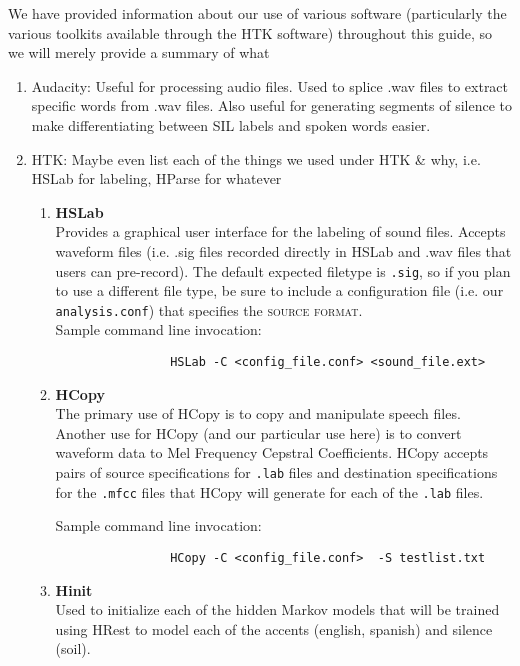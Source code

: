 \documentclass{wileySev}
\begin{document}
We have provided information about our use of various software (particularly the various toolkits available through the HTK software) throughout this guide, so we will merely provide a summary of what 
\begin{enumerate}
	\item Audacity: Useful for processing audio files. Used to splice .wav files to extract specific words from .wav files. Also useful for generating segments of silence to make differentiating between SIL labels and spoken words easier.
	\item HTK: Maybe even list each of the things we used under HTK \& why, i.e. HSLab for labeling, HParse for whatever
		\begin{enumerate}
			\item \textbf{HSLab}\\
				Provides a graphical user interface for the labeling of sound files. Accepts waveform files (i.e. .sig files recorded directly in HSLab and .wav files that users can pre-record). The default expected filetype is \texttt{.sig}, so if you plan to use a different file type, be sure to include a configuration file (i.e. our \texttt{analysis.conf}) that specifies the \textsc{source format}.\\
				
				Sample command line invocation: 
				\begin{verbatim}
				HSLab -C <config_file.conf> <sound_file.ext>
				\end{verbatim}
			\item \textbf{HCopy}\\
				The primary use of HCopy is to copy and manipulate speech files. Another use for HCopy (and our particular use here) is to convert waveform data to Mel Frequency Cepstral Coefficients.
				HCopy accepts pairs of source specifications for \texttt{.lab} files and destination specifications for the \texttt{.mfcc} files that HCopy will generate for each of the \texttt{.lab} files.
				
				Sample command line invocation: 
				\begin{verbatim}
				HCopy -C <config_file.conf>  -S testlist.txt
				\end{verbatim}
			\item \textbf{Hinit}\\
				Used to initialize each of the hidden Markov models that will be trained using HRest to model each of the accents (english, spanish) and silence (soil).
				

\end{enumerate}
\end{enumerate}
\end{document}
